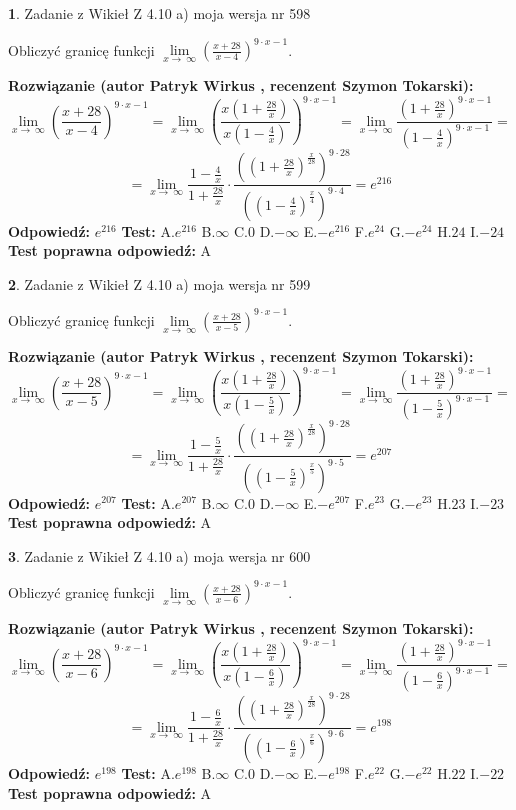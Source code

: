 \documentclass[12pt, a4paper]{article}
\theoremstyle{definition} %
\newtheorem{zad}{}
\newcommand{\zadStart}[1]{\begin{zad}#1\newline}
\newcommand{\zadStop}{\end{zad}}
\newcommand{\rozwStart}[2]{\noindent \textbf{Rozwiązanie (autor #1 , recenzent #2): }\newline}
\newcommand{\rozwStop}{\newline}
\newcommand{\odpStart}{\noindent \textbf{Odpowiedź:}\newline}
\newcommand{\odpStop}{\newline}
\newcommand{\testStart}{\noindent \textbf{Test:}\newline}
\newcommand{\testStop}{\newline}
\newcommand{\kluczStart}{\noindent \textbf{Test poprawna odpowiedź:}\newline}
\newcommand{\kluczStop}{\newline}
\begin{document}
\zadStart{Zadanie z Wikieł Z 4.10 a) moja wersja nr 598}

Obliczyć granicę funkcji  $\lim\limits_{x\to\ \infty}(\frac{x+28}{x-4})^{9\cdot x-1}$.
\zadStop
\rozwStart{Patryk Wirkus}{Szymon Tokarski}
$$\lim\limits_{x\to\ \infty}(\frac{x+28}{x-4})^{9\cdot x-1} = \lim\limits_{x\to\ \infty}(\frac{x(1+\frac{28}{x})}{x(1-\frac{4}{x})})^{9\cdot x-1}=\lim\limits_{x\to\ \infty}\frac{(1+\frac{28}{x})^{9\cdot x-1}}{(1-\frac{4}{x})^{9\cdot x-1}}=$$
$$=\lim\limits_{x\to\ \infty}\frac{1-\frac{4}{x}}{1+\frac{28}{x}}\cdot\frac{((1+\frac{28}{x})^{\frac{x}{28}})^{9\cdot28}}{((1-\frac{4}{x})^{\frac{x}{4}})^{9\cdot4}}=e^{216}$$
\rozwStop
\odpStart
$e^{216}$
\odpStop
\testStart
A.$e^{216}$ B.$\infty$ C.$0$ D.$-\infty$ E.$-e^{216}$
F.$e^{24}$ G.$-e^{24}$
H.$24$
I.$-24$
\testStop
\kluczStart
A
\kluczStop



\zadStart{Zadanie z Wikieł Z 4.10 a) moja wersja nr 599}

Obliczyć granicę funkcji  $\lim\limits_{x\to\ \infty}(\frac{x+28}{x-5})^{9\cdot x-1}$.
\zadStop
\rozwStart{Patryk Wirkus}{Szymon Tokarski}
$$\lim\limits_{x\to\ \infty}(\frac{x+28}{x-5})^{9\cdot x-1} = \lim\limits_{x\to\ \infty}(\frac{x(1+\frac{28}{x})}{x(1-\frac{5}{x})})^{9\cdot x-1}=\lim\limits_{x\to\ \infty}\frac{(1+\frac{28}{x})^{9\cdot x-1}}{(1-\frac{5}{x})^{9\cdot x-1}}=$$
$$=\lim\limits_{x\to\ \infty}\frac{1-\frac{5}{x}}{1+\frac{28}{x}}\cdot\frac{((1+\frac{28}{x})^{\frac{x}{28}})^{9\cdot28}}{((1-\frac{5}{x})^{\frac{x}{5}})^{9\cdot5}}=e^{207}$$
\rozwStop
\odpStart
$e^{207}$
\odpStop
\testStart
A.$e^{207}$ B.$\infty$ C.$0$ D.$-\infty$ E.$-e^{207}$
F.$e^{23}$ G.$-e^{23}$
H.$23$
I.$-23$
\testStop
\kluczStart
A
\kluczStop



\zadStart{Zadanie z Wikieł Z 4.10 a) moja wersja nr 600}

Obliczyć granicę funkcji  $\lim\limits_{x\to\ \infty}(\frac{x+28}{x-6})^{9\cdot x-1}$.
\zadStop
\rozwStart{Patryk Wirkus}{Szymon Tokarski}
$$\lim\limits_{x\to\ \infty}(\frac{x+28}{x-6})^{9\cdot x-1} = \lim\limits_{x\to\ \infty}(\frac{x(1+\frac{28}{x})}{x(1-\frac{6}{x})})^{9\cdot x-1}=\lim\limits_{x\to\ \infty}\frac{(1+\frac{28}{x})^{9\cdot x-1}}{(1-\frac{6}{x})^{9\cdot x-1}}=$$
$$=\lim\limits_{x\to\ \infty}\frac{1-\frac{6}{x}}{1+\frac{28}{x}}\cdot\frac{((1+\frac{28}{x})^{\frac{x}{28}})^{9\cdot28}}{((1-\frac{6}{x})^{\frac{x}{6}})^{9\cdot6}}=e^{198}$$
\rozwStop
\odpStart
$e^{198}$
\odpStop
\testStart
A.$e^{198}$ B.$\infty$ C.$0$ D.$-\infty$ E.$-e^{198}$
F.$e^{22}$ G.$-e^{22}$
H.$22$
I.$-22$
\testStop
\kluczStart
A
\kluczStop
\end{document}

